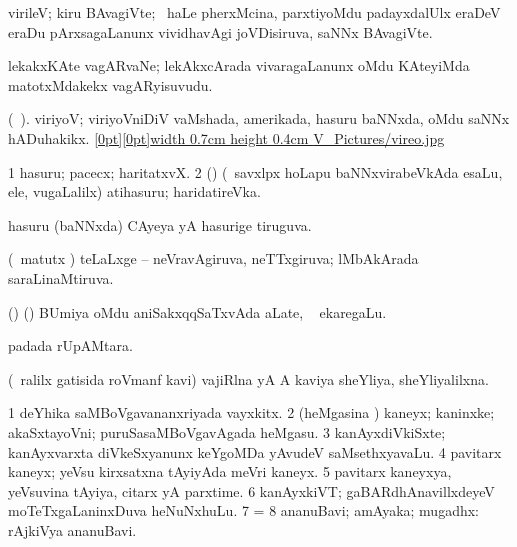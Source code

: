 {{{{{{{{\bentry
{} 
\gl{\nA}
\expl{}
\bmng
 virileV; kiru BAvagiVte; \kanmu\ haLe pherxMcina, parxtiyoMdu padayxdalUlx eraDeV eraDu pArxsagaLanunx vividhavAgi joVDisiruva, saNNx BAvagiVte. 
\emng
\eentry

\bentry
{} 
\gl{\nA}
\expl{}
\bmng
 lekakxKAte vagARvaNe; lekAkxcArada vivaragaLanunx oMdu KAteyiMda matotxMdakekx vagARyisuvudu. 
\emng
\eentry

\bentry
{} 
\gl{\nA}(\bava\ ).
\bmng
 viriyoV; viriyoVniDiV vaMshada, amerikada, hasuru baNNxda, oMdu saNNx hADuhakikx. \quad \hyperlink{vireofigure}{\raisebox{-0.15cm}[0pt][0pt]{\pdfimage width 0.7cm height 0.4cm {V_Pictures/vireo.jpg}}} 
\emng
\eentry

\bentry
{} 
\gl{\nA}
\expl{}
\bmng
\bnum
\num{1} hasuru; pacecx; haritatxvX. 
\num{2} (\savi) (\sA\ savxlpx hoLapu baNNxvirabeVkAda esaLu, ele, \mo vugaLalilx) atihasuru; haridatireVka. 
\enum
\emng
\eentry

\bentry
{} 
\gl{\gu}
\expl{}
\bmng
 hasuru (baNNxda) CAyeya yA hasurige tiruguva. 
\emng
\eentry

\bentry
{} 
\gl{\gu}
\expl{}
\bmng
 (\savi\ matutx \pArxvi) teLaLxge -- neVravAgiruva, neTTxgiruva; lMbAkArada saraLinaMtiruva. 
\emng
\eentry

\bentry
{} 
\gl{\nA}
\expl{}
\bmng
 (\birx) (\ca) BUmiya oMdu aniSakxqqSaTxvAda aLate, \kanmu\  ekaregaLu. 
\emng
\eentry

\bentry
{} 
\gl{\nA}
\expl{}
\bmng
  padada rUpAMtara. 
\emng
\eentry

\bentry
{} 
\gl{\gu}
\expl{}
\bmng
 (\kirxpU\ ralilx gatisida roVmanf kavi) vajiRlna yA A kaviya sheYliya, sheYliyalilxna. 
\emng
\eentry

\bentry
{} 
\gl{\nA}
\expl{}
\bmng
\bnum
\num{1} deYhika saMBoVgavananxriyada vayxkitx. 
\num{2} (heMgasina \vi) kaneyx; kaninxke; akaSxtayoVni; puruSasaMBoVgavAgada heMgasu. 
\num{3} kanAyxdiVkiSxte; kanAyxvarxta diVkeSxyanunx keYgoMDa yAvudeV saMsethxyavaLu. 
\hypertarget{virgin(4)}{} 
\num{4} pavitarx kaneyx; yeVsu kirxsatxna tAyiyAda meVri kaneyx. 
\num{5} pavitarx kaneyxya, yeVsuvina tAyiya, citarx yA parxtime. 
\num{6} kanAyxkiVT; gaBARdhAnavillxdeyeV moTeTxgaLaninxDuva heNuNxhuLu. 
\num{7} =  
\num{8} ananuBavi; amAyaka; mugadhx:  rAjkiVya ananuBavi. 
\enum
\emng

}}}}}}}}
